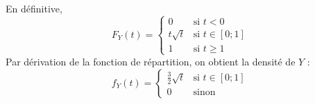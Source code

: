 {\begin{enumerate}
{    En définitive, $$F_Y(t) = \begin{cases}
        0 & \text{si } t < 0 \\
        t\sqrt{t} & \text{si } t \in [0;1] \\
        1 & \text{si } t \geq 1
    \end{cases}$$
Par dérivation de la fonction de répartition, on obtient la densité de $Y$ : 
$$f_Y(t) = \begin{cases}
    \frac{3}{2}\sqrt{t} & \text{si } t \in [0;1] \\
    0 & \text{sinon}
\end{cases}$$
    }
\end{enumerate}
}